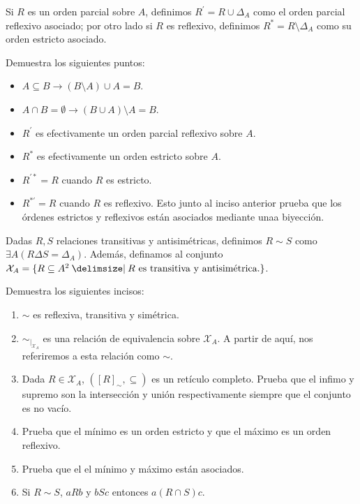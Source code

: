 \begin{exercise}[parzfc=2]
  Si $R$ es un orden parcial sobre $A$, definimos $R^\prime=R\cup \Delta_A$ como el orden parcial reflexivo asociado; por otro lado si $R$ es reflexivo, definimos $R^*=R\setminus \Delta_A$ como su orden estricto asociado.

  Demuestra los siguientes puntos:
  \begin{itemize}
      \item $A\subseteq B\rightarrow (B\setminus A)\cup A=B$.
      \item $A\cap B=\emptyset\rightarrow (B\cup A)\setminus A=B$.
      \item $R^\prime$ es efectivamente un orden parcial reflexivo sobre $A$.
      \item $R^*$ es efectivamente un orden estricto sobre $A$.
      \item $R^{\prime*}=R$ cuando $R$ es estricto.
      \item $R^{*\prime}=R$ cuando $R$ es reflexivo. Esto junto al inciso anterior prueba que los órdenes estrictos y reflexivos están asociados mediante unaa biyección.
  \end{itemize}
\end{exercise}


\begin{exercise}[parzfc=2]
  Dadas $R,S$ relaciones transitivas y antisimétricas, definimos $R\sim S$ como ${\exists A (R\Delta S = \Delta_A)}$. Además, definamos al conjunto $\mathcal{X}_A=\set{R\subseteq A^2\st R \text{ es transitiva y antisimétrica.}}$.
  
  Demuestra los siguientes incisos:
  \begin{enumerate}
      \item $\sim$ es reflexiva, transitiva y simétrica.
      \item $\sim_{|_{\mathcal{X}_A}}$ es una relación de equivalencia sobre $\mathcal{X}_A$. A partir de aquí, nos referiremos a esta relación como $\sim$.
      \item Dada $R\in \mathcal{X}_A$, $([R]_\sim, \subseteq)$ es un retículo completo. Prueba que el infimo y supremo son la intersección y unión respectivamente siempre que el conjunto es no vacío.
      \item Prueba que el mínimo es un orden estricto y que el máximo es un orden reflexivo.
      \item Prueba que el el mínimo y máximo están asociados.
      \item Si $R\sim S$, $aRb$ y $bSc$ entonces $a(R\cap S) c$.
  \end{enumerate}
  
\end{exercise}

